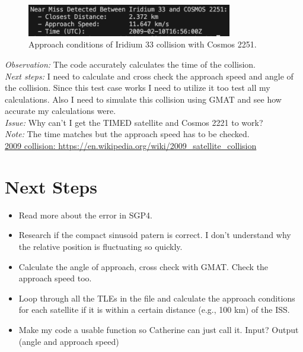 \documentclass[12pt]{report}
\begin{document}
\begin{enumerate}
  \begin{figure}[H]
    \centering
    \includegraphics[width=0.8\textwidth]{figure_week_3_ird33vscos2251.png}
    \caption{Approach conditions of Iridium 33 collision with Cosmos 2251.}
    \label{fig:iridium_collision_approach}
  \end{figure}
  
    \textit{Observation:} The code accurately calculates the time of the collision.\\
    \textit{Next steps:} I need to calculate and cross check the approach speed and angle of the collision. Since this test case works I need to utilize it too test all my calculations. Also I need to simulate this collision using GMAT and see how accurate my calculations were.\\
    \textit{Issue:} Why can't I get the TIMED satellite and Cosmos 2221 to work?\\
    \textit{Note:} The time matches but the approach speed has to be checked.\\

  \url{2009 collision: https://en.wikipedia.org/wiki/2009_satellite_collision}

\end{enumerate}

\chapter*{Next Steps}
\begin{itemize}
  \item Read more about the error in SGP4.
  \item Research if the compact sinusoid patern is correct. I don't understand why the relative position is fluctuating so quickly.
  \item Calculate the angle of approach, cross check with GMAT. Check the approach speed too.
  \item Loop through all the TLEs in the file and calculate the approach conditions for each satellite if it is within a certain distance (e.g., 100 km) of the ISS.
  \item Make my code a usable function so Catherine can just call it. Input? \textrightarrow{} Output (angle and approach speed)
\end{itemize}
\end{document}
